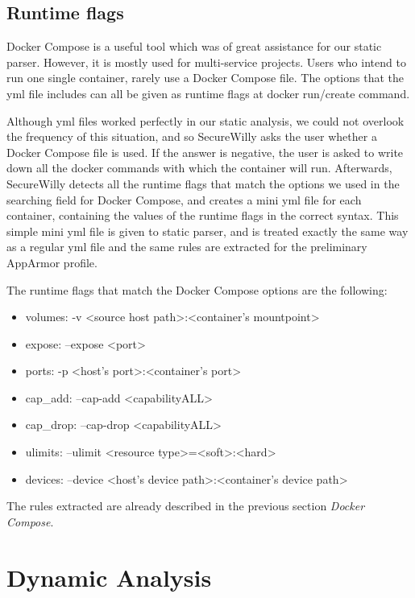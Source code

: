 \subsection{Runtime flags}
Docker Compose is a useful tool which was of great assistance for our static parser. However, it is mostly used for multi-service projects. Users who intend to run one single container, rarely use a Docker Compose file. The options that the yml file includes can all be given as runtime flags at docker run/create command. 

Although yml files worked perfectly in our static analysis, we could not overlook the frequency of this situation, and so SecureWilly asks the user whether a Docker Compose file is used. If the answer is negative, the user is asked to write down all the docker commands with which the container will run. Afterwards, SecureWilly detects all the runtime flags that match the options we used in the searching field for Docker Compose, and creates a mini yml file for each container, containing the values of the runtime flags in the correct syntax. This simple mini yml file is given to static parser, and is treated exactly the same way as a regular yml file and the same rules are extracted for the preliminary AppArmor profile.

The runtime flags that match the Docker Compose options are the following:
\begin{itemize}
\item volumes: -v \textless source host path\textgreater{}:\textless container's mountpoint\textgreater{}
\item expose: --expose \textless port\textgreater{}
\item ports: -p \textless host's port\textgreater{}:\textless container's port\textgreater{}
\item cap\_add: --cap-add \textless capability\textbar ALL\textgreater{}
\item cap\_drop: --cap-drop \textless capability\textbar ALL\textgreater{}
\item ulimits: --ulimit \textless resource type\textgreater{}=\textless soft\textgreater{}:\textless hard\textgreater{}
\item devices: --device \textless host's device path\textgreater{}:\textless container's device path\textgreater{}
\end{itemize}

The rules extracted are already described in the previous section \textit{Docker Compose}. 

\section{Dynamic Analysis}

